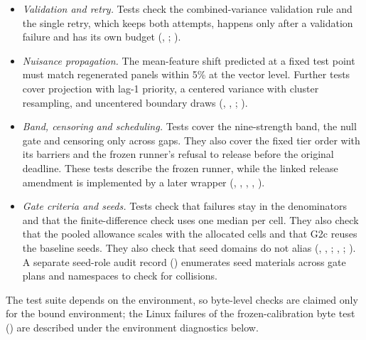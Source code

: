 \begin{itemize}
\item \emph{Validation and retry.} Tests check the combined-variance validation rule and the single retry, which keeps both attempts, happens only after a validation failure and has its own budget (, ; ).
\item \emph{Nuisance propagation.} The mean-feature shift predicted at a fixed test point must match regenerated panels within 5\% at the vector level. Further tests cover projection with lag-1 priority, a centered variance with cluster resampling, and uncentered boundary draws (, , ; ).
\item \emph{Band, censoring and scheduling.} Tests cover the nine-strength band, the null gate and censoring only across gaps. They also cover the fixed tier order with its barriers and the frozen runner's refusal to release before the original deadline. These tests describe the frozen runner, while the linked release amendment is implemented by a later wrapper (, , , , ).
\item \emph{Gate criteria and seeds.} Tests check that failures stay in the denominators and that the finite-difference check uses one median per cell. They also check that the pooled allowance scales with the allocated cells and that G2c reuses the baseline seeds. They also check that seed domains do not alias (, , ; , ; ). A separate seed-role audit record () enumerates seed materials across gate plans and namespaces to check for collisions.
\end{itemize}
The test suite depends on the environment, so byte-level checks are claimed only for the bound environment; the Linux failures of the frozen-calibration byte test () are described under the environment diagnostics below.

